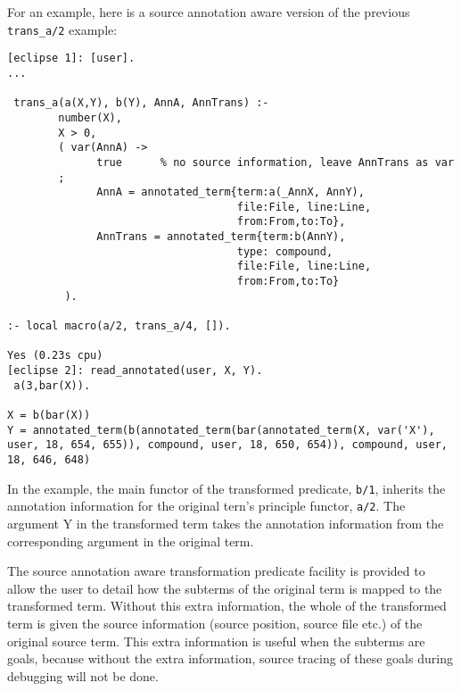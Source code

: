For an example, here is a source annotation aware version of the previous
 \verb'trans_a/2' example:

\begin{verbatim}
[eclipse 1]: [user].
...

 trans_a(a(X,Y), b(Y), AnnA, AnnTrans) :-    
        number(X),           
        X > 0,
        ( var(AnnA) ->
              true      % no source information, leave AnnTrans as var
        ;
              AnnA = annotated_term{term:a(_AnnX, AnnY),
                                    file:File, line:Line,
                                    from:From,to:To},
              AnnTrans = annotated_term{term:b(AnnY),
                                    type: compound,
                                    file:File, line:Line,
                                    from:From,to:To}
         ).               

:- local macro(a/2, trans_a/4, []).

Yes (0.23s cpu)
[eclipse 2]: read_annotated(user, X, Y).   
 a(3,bar(X)).

X = b(bar(X))
Y = annotated_term(b(annotated_term(bar(annotated_term(X, var('X'), user, 18, 654, 655)), compound, user, 18, 650, 654)), compound, user, 18, 646, 648)

\end{verbatim}

In the example, the main functor of the transformed predicate, \verb'b/1',
inherits the annotation information for the original tern's principle
functor, \verb'a/2'. The argument Y in the transformed term takes the 
annotation information from the corresponding argument in the original
term. 



   The source annotation aware transformation predicate facility is provided to
   allow the user to detail how the subterms of the original term is mapped
   to the transformed term. Without this extra information, the whole of
   the transformed term is given the source information (source position,
   source file etc.) of the original source term. This extra information is
   useful when the subterms are goals, because without the extra
   information, source tracing of these goals during debugging will not be
   done.


